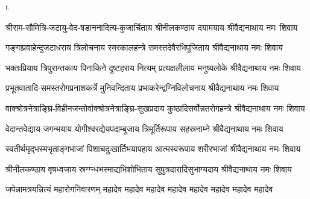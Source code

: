 t%

\twolineshloka
{श्रीराम-सौमित्रि-जटायु-वेद-षडाननादित्य-कुजार्चिताय}
{श्रीनीलकण्ठाय दयामयाय श्रीवैद्यनाथाय नमः शिवाय}

%
\twolineshloka
{गङ्गाप्रवाहेन्दुजटाधराय त्रिलोचनाय स्मरकालहन्त्रे}
{समस्तदेवैरभिपूजिताय श्रीवैद्यनाथाय नमः शिवाय}

\twolineshloka
{भक्तःप्रियाय त्रिपुरान्तकाय पिनाकिने दुष्टहराय नित्यम्}
{प्रत्यक्षलीलाय मनुष्यलोके श्रीवैद्यनाथाय नमः शिवाय}

\twolineshloka
{प्रभूतवातादि-समस्तरोगप्रनाशकर्त्रे मुनिवन्दिताय}
{प्रभाकरेन्द्वग्निविलोचनाय श्रीवैद्यनाथाय नमः शिवाय}

\twolineshloka
{वाक्श्रोत्रनेत्राङ्घ्रि-विहीनजन्तोर्वाक्श्रोत्रनेत्राङ्घ्रि-सुखप्रदाय}
{कुष्ठादिसर्वोन्नतरोगहन्त्रे श्रीवैद्यनाथाय नमः शिवाय}

\twolineshloka
{वेदान्तवेद्याय जगन्मयाय योगीश्वरद्येयपदाम्बुजाय}
{त्रिमूर्तिरूपाय सहस्रनाम्ने श्रीवैद्यनाथाय नमः शिवाय}

\twolineshloka
{स्वतीर्थमृद्भस्मभृताङ्गभाजां पिशाचदुःखार्तिभयापहाय}
{आत्मस्वरूपाय शरीरभाजां श्रीवैद्यनाथाय नमः शिवाय}

\twolineshloka
{श्रीनीलकण्ठाय वृषध्वजाय स्रग्ग्न्धभस्माद्यभिशोभिताय}
{सुपुत्रदारादिसुभाग्यदाय श्रीवैद्यनाथाय नमः शिवाय}

{जपेन्नामत्रयन्नित्यं महारोगनिवारणम्}
{महादेव महादेव महादेव महादेव महादेव महादेव महादेव महादेव}
